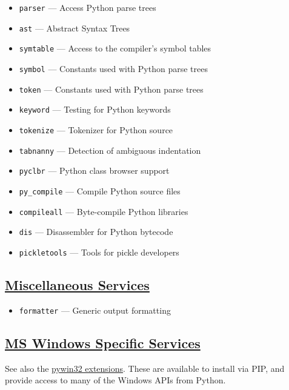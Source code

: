\documentclass[]{book}
\providecommand{\tightlist}{%
  \setlength{\itemsep}{0pt}\setlength{\parskip}{0pt}}
\theoremstyle{definition}
\theoremstyle{definition}
\theoremstyle{definition}
\theoremstyle{remark}
\begin{document}
\begin{itemize}
\tightlist
\item
  \texttt{parser} --- Access Python parse trees
\item
  \texttt{ast} --- Abstract Syntax Trees
\item
  \texttt{symtable} --- Access to the compiler's symbol tables
\item
  \texttt{symbol} --- Constants used with Python parse trees
\item
  \texttt{token} --- Constants used with Python parse trees
\item
  \texttt{keyword} --- Testing for Python keywords
\item
  \texttt{tokenize} --- Tokenizer for Python source
\item
  \texttt{tabnanny} --- Detection of ambiguous indentation
\item
  \texttt{pyclbr} --- Python class browser support
\item
  \texttt{py\_compile} --- Compile Python source files
\item
  \texttt{compileall} --- Byte-compile Python libraries
\item
  \texttt{dis} --- Disassembler for Python bytecode
\item
  \texttt{pickletools} --- Tools for pickle developers
\end{itemize}

\subsection{\texorpdfstring{\href{https://docs.python.org/3.7/library/misc.html}{Miscellaneous
Services}}{Miscellaneous Services}}\label{miscellaneous-services}

\begin{itemize}
\tightlist
\item
  \texttt{formatter} --- Generic output formatting
\end{itemize}

\subsection{\texorpdfstring{\href{https://docs.python.org/3.7/library/misc.html}{MS
Windows Specific
Services}}{MS Windows Specific Services}}\label{ms-windows-specific-services}

See also the
\href{https://docs.python.org/3.7/library/misc.html}{pywin32
extensions}. These are available to install via PIP, and provide access
to many of the Windows APIs from Python.
\end{document}

